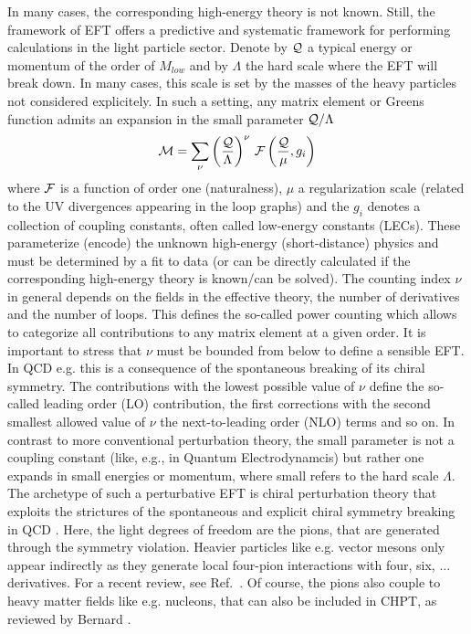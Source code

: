 \documentclass[aps,rmp,nofootinbib,twocolumn,floatfix]{revtex4}
\newcommand{\beq}{\begin{equation}}
\newcommand{\eeq}{\end{equation}}
\newcommand{\Mlo}{M_{low}}
\begin{document}
\noindent In many cases, the corresponding high-energy theory
is not known. Still, the framework of EFT offers a predictive
and systematic framework for performing calculations in the
light particle sector. Denote by ${\cal Q}$ a typical energy
or momentum of the order of $\Mlo$ and by $\Lambda$ the
hard scale where the EFT will break down. In many cases, this
scale is set by the masses of the heavy particles not considered
explicitely. In such a setting, any matrix element or Greens
function admits an expansion in the small parameter ${\cal Q}/
\Lambda$ \cite{Weinberg:1978kz} 
\beq
{\cal M} = \sum\limits_{\nu} \left(\frac{\cal Q}{\Lambda}\right)^{\nu}  
\,{\cal F} \left(\frac{{\cal Q}}{\mu}, g_i\right)
\eeq
where ${\cal F}$ is a function of order one (naturalness), $\mu$
a regularization scale (related to the UV divergences appearing
in the loop graphs) and the $g_i$ denotes a collection of
coupling constants, often called low-energy constants (LECs).
These parameterize (encode) the unknown high-energy (short-distance)
physics and must be determined by a fit to  data (or
can be directly calculated if the corresponding high-energy theory
is known/can be solved). The counting index $\nu$ in general depends 
on the fields in the effective theory, the number of derivatives and
the number of loops. This defines the so-called power counting 
which allows to categorize all contributions to any matrix element
at a given order.  It is important to stress that $\nu$ must be
bounded from below to define a sensible EFT. In QCD e.g. this is 
a consequence of the spontaneous breaking of its chiral symmetry. 
The contributions with the lowest possible value of $\nu$ 
define the so-called leading order (LO) contribution, the first
corrections with the second smallest allowed value of $\nu$ the
next-to-leading order (NLO) terms and so on. In contrast to more
conventional perturbation theory, the small parameter is not a 
coupling constant (like, e.g., in Quantum Electrodynamcis) but 
rather one expands in small energies or momentum, where small 
refers to  the hard scale $\Lambda$. The archetype of such
a perturbative EFT is chiral perturbation theory that exploits the
strictures of the spontaneous and explicit chiral symmetry breaking
in QCD \cite{Gasser:1983yg,Gasser:1984gg}.  Here, the light degrees
of freedom are the pions, that are generated through the symmetry violation.
Heavier particles like e.g. vector mesons only appear indirectly
as they generate local four-pion interactions with four, six, $\ldots$
derivatives. For a recent review, see Ref.~\cite{Bernard:2006gx}.  
Of course, the pions also couple to heavy matter fields like e.g. 
nucleons, that can also be included in CHPT, as reviewed by Bernard
\cite{Bernard:2007zu}.
\end{document}
